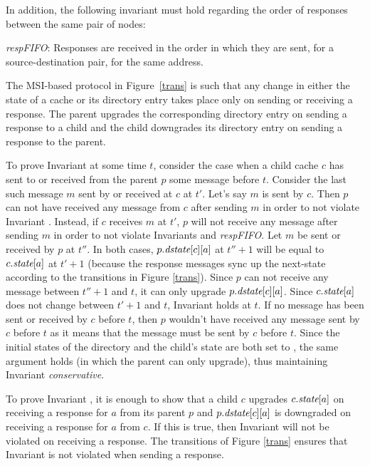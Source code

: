 In addition, the following invariant must hold regarding the order of responses
between the same pair of nodes:
\begin{inv}
\textit{respFIFO}: Responses are received in the order in which they are sent,
for a source-destination pair, for the same address.
\end{inv}

The MSI-based protocol in Figure~\ref{trans} is such that any change in either
the state of a cache or its directory entry takes place only on sending or
receiving a response. The parent upgrades the corresponding directory entry on
sending a response to a child and the child downgrades its directory entry on
sending a response to the parent.

To prove Invariant  at some time $t$, consider the case
when a child cache $c$ has sent to or received from the parent $p$ some message
before $t$. Consider the last such message $m$ sent by or received at $c$ at
$t'$. Let's say $m$ is sent by $c$. Then $p$ can not have received any message
from $c$ after sending $m$ in order to not violate Invariant .
Instead, if $c$ receives $m$ at $t'$, $p$ will not receive any message after
sending $m$ in order to not violate Invariants  and
\textit{respFIFO}. Let $m$ be sent or received by $p$ at $t''$. In both cases,
$p.\textit{dstate}[c][a]$ at $t''+1$ will be equal to $c.\textit{state}[a]$ at $t'+1$ (because
the response messages sync up the next-state according to the transitions in
Figure \ref{trans}). Since $p$ can not receive any message between $t''+1$ and
$t$, it can only upgrade $p.\textit{dstate}[c][a]$. Since $c.\textit{state}[a]$ does not change
between $t'+1$ and $t$, Invariant  holds at $t$. If no
message has been sent or received by $c$ before $t$, then $p$
wouldn't have received any message sent by $c$ before $t$ as it means that the
message must be sent by $c$ before $t$. Since the initial states of the
directory and the child's state are both set to \In{}, the same argument holds
(in which the parent can only upgrade), thus maintaining Invariant
\textit{conservative}.

To prove Invariant , it is enough to show that a
child $c$ upgrades $c.\textit{state}[a]$ on receiving a response for $a$ from its
parent $p$ and $p.\textit{dstate}[c][a]$ is downgraded on receiving a response for $a$
from $c$. If this is true, then Invariant  will not
be violated on receiving a response. The transitions of Figure \ref{trans}
ensures that Invariant  is not violated when sending
a response.


